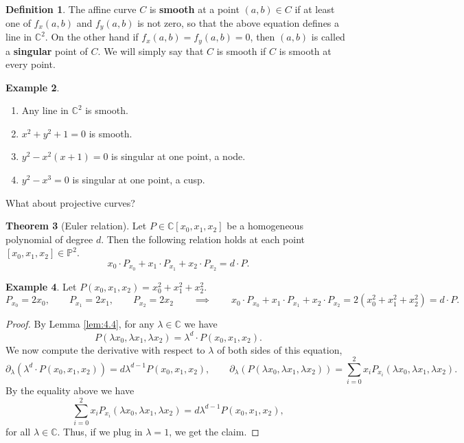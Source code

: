 \documentclass{article}
\newcommand{\C}{\mathbb{C}}
\renewcommand{\P}{\mathbb{P}}
\newcommand{\rb}[1]{\left( #1 \right)}
\renewcommand{\sb}[1]{\left[ #1 \right]}
\theoremstyle{definition}\newtheorem{definition}{Definition}[section]
\theoremstyle{definition}\newtheorem{notation}[definition]{Notation}
\theoremstyle{definition}\newtheorem{remark}[definition]{Remark}
\theoremstyle{definition}\newtheorem{example}[definition]{Example}
\theoremstyle{definition}\newtheorem{fact}{Fact}
\theoremstyle{definition}\newtheorem{exercise}{Exercise}
\newtheorem{theorem}[definition]{Theorem}
\begin{document}
\begin{definition}
The affine curve $ C $ is \textbf{smooth} at a point $ \rb{a, b} \in C $ if at least one of $ f_x\rb{a, b} $ and $ f_y\rb{a, b} $ is not zero, so that the above equation defines a line in $ \C^2 $. On the other hand if $ f_x\rb{a, b} = f_y\rb{a, b} = 0 $, then $ \rb{a, b} $ is called a \textbf{singular} point of $ C $. We will simply say that $ C $ is smooth if $ C $ is smooth at every point.
\end{definition}

\begin{example}
\hfill
\begin{enumerate}
\item Any line in $ \C^2 $ is smooth.
\item $ x^2 + y^2 + 1 = 0 $ is smooth.
\item $ y^2 - x^2\rb{x + 1} = 0 $ is singular at one point, a node.
\item $ y^2 - x^3 = 0 $ is singular at one point, a cusp.
\end{enumerate}
\end{example}

What about projective curves?

\begin{theorem}[Euler relation]
\label{thm:7.3}
Let $ P \in \C\sb{x_0, x_1, x_2} $ be a homogeneous polynomial of degree $ d $. Then the following relation holds at each point $ \sb{x_0, x_1, x_2} \in \P^2 $.
$$ x_0 \cdot P_{x_0} + x_1 \cdot P_{x_1} + x_2 \cdot P_{x_2} = d \cdot P. $$
\end{theorem}

\begin{example}
Let $ P\rb{x_0, x_1, x_2} = x_0^2 + x_1^2 + x_2^2 $.
$$ P_{x_0} = 2x_0, \qquad P_{x_1} = 2x_1, \qquad P_{x_2} = 2x_2 \qquad \implies \qquad x_0 \cdot P_{x_0} + x_1 \cdot P_{x_1} + x_2 \cdot P_{x_2} = 2\rb{x_0^2 + x_1^2 + x_2^2} = d \cdot P. $$
\end{example}

\begin{proof}
By Lemma \ref{lem:4.4}, for any $ \lambda \in \C $ we have
$$ P\rb{\lambda x_0, \lambda x_1, \lambda x_2} = \lambda^d \cdot P\rb{x_0, x_1, x_2}. $$
We now compute the derivative with respect to $ \lambda $ of both sides of this equation,
$$ \partial_\lambda\rb{\lambda^d \cdot P\rb{x_0, x_1, x_2}} = d\lambda^{d - 1}P\rb{x_0, x_1, x_2}, \qquad \partial_\lambda\rb{P\rb{\lambda x_0, \lambda x_1, \lambda x_2}} = \sum_{i = 0}^2 x_iP_{x_i}\rb{\lambda x_0, \lambda x_1, \lambda x_2}. $$
By the equality above we have
$$ \sum_{i = 0}^2 x_iP_{x_i}\rb{\lambda x_0, \lambda x_1, \lambda x_2} = d\lambda^{d - 1}P\rb{x_0, x_1, x_2}, $$
for all $ \lambda \in \C $. Thus, if we plug in $ \lambda = 1 $, we get the claim.
\end{proof}
\end{document}
